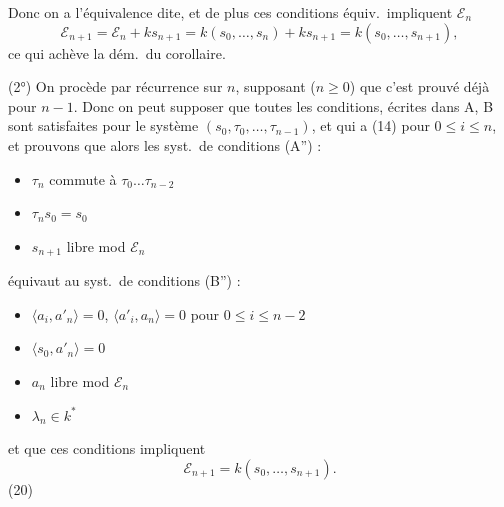 \documentclass[11pt,a4paper]{article}
\begin{document}
Donc on a l'équivalence dite, et de plus ces conditions équiv.\ impliquent  $\mathcal{E}_n$
\[
\mathcal{E}_{n+1} = \mathcal{E}_n + k s_{n+1} = k(s_0, \dots, s_n) + k s_{n+1} = k(s_0, \dots, s_{n+1}) ,
\]
ce qui achève la dém.\ du corollaire.

(2°) On procède par récurrence sur $n$, supposant ($n \geq 0$) que c'est prouvé déjà pour $n-1$. Donc on peut supposer que toutes les conditions, écrites dans A, B sont satisfaites pour le système $(s_0, \tau_0, \dots, \tau_{n-1})$, et qui a    (14) pour $0 \leq i \leq n$, et prouvons que alors les syst.\ de conditions
(A'') :
\begin{itemize}
\item[$\alpha$)] $\tau_n$ commute à $\tau_0 \dots \tau_{n-2}$
\item[$\beta$)] $\tau_n s_0 = s_0$
\item[$\gamma$)] $s_{n+1}$ libre mod $\mathcal{E}_n$
\end{itemize}
équivaut au syst.\ de conditions (B'') :
\begin{itemize}
\item[$\alpha$)] $\langle a_i, a'_n \rangle = 0$, $\langle a'_i, a_n \rangle = 0$ pour $0 \leq i \leq n-2$
\item[$\beta$)] $\langle s_0, a'_n \rangle = 0$
\item[$\gamma$)] $a_n$ libre mod $\mathcal{E}_n$
\item[$\delta$)] $\lambda_n \in k^*$
\end{itemize}
et que ces conditions impliquent
\[
\mathcal{E}_{n+1} = k(s_0, \dots, s_{n+1}) .
\]
(20)
\end{document}
